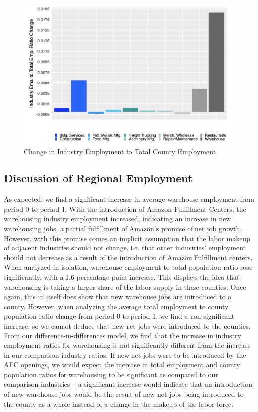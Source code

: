 \documentclass[11pt]{article}
\begin{document}
\begin{figure}[H]
\centering
\includegraphics[width=15cm]{TOTEMP.png}
\caption{Change in Industry Employment to Total County Employment}
\end{figure}

\subsection{Discussion of Regional Employment}

\-\hspace{0.5cm} As expected, we find a significant increase in average warehouse employment from period 0 to period 1. With the introduction of Amazon Fulfillment Centers, the warehousing industry employment increased, indicating an increase in new warehousing jobs, a partial fulfillment of Amazon's promise of net job growth. However, with this promise comes an implicit assumption that the labor makeup of adjacent industries should not change, i.e. that other industries' employment should not decrease as a result of the introduction of Amazon Fulfillment centers. When analyzed in isolation, warehouse employment to total population ratio rose significantly, with a 1.6 percentage point increase. This displays the idea that warehousing is taking a larger share of the labor supply in these counties. Once again, this in itself does show that new warehouse jobs are introduced to a county. However, when analyzing the average total employment to county population ratio change from period 0 to period 1, we find a non-significant increase, so we cannot deduce that new net jobs were introduced to the counties. From our difference-in-differences model, we find that the increase in industry employment ratios for warehousing is not significantly different from the increase in our comparison industry ratios. If new net jobs were to be introduced by the AFC openings, we would expect the increase in total employment and county population ratios for warehousing to be significant as compared to our comparison industries -- a significant increase would indicate that an introduction of new warehouse jobs would be the result of new net jobs being introduced to the county as a whole instead of a change in the makeup of the labor force.
\end{document}
